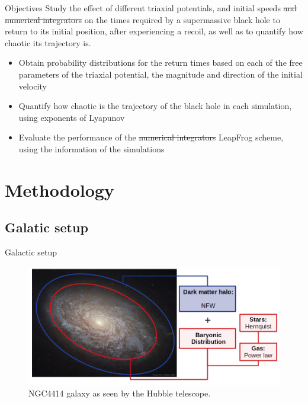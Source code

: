 \documentclass{beamer}
\begin{document}
\begin{frame}{Objectives}
	\small
	Study the effect of different triaxial potentials, and initial speeds \sout{and numerical integrators} on the times required by a supermassive black hole to return to its initial position, after experiencing a recoil, as well as to quantify how chaotic its trajectory is.
	
	\begin{itemize}
		\item Obtain probability distributions for the return times based on each of the free parameters of the triaxial potential, the magnitude and direction of the initial velocity
		\item Quantify how chaotic is the trajectory of the black hole in each simulation, using exponents of Lyapunov
		\item Evaluate the performance of the \sout{numerical integrators} LeapFrog scheme, using the information of the simulations
	\end{itemize}
\end{frame}

\section{Methodology}
\subsection{Galatic setup}
\begin{frame}{Galactic setup}
	\begin{figure}[h]
		\centering
		\includegraphics[width=0.8\linewidth]{../Documento/Figures/NGC4414_modified}
		\caption{NGC4414 galaxy as seen by the Hubble telescope.}
	\end{figure}
\end{frame}
\end{document}
